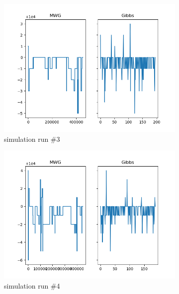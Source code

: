 \begin{figure}[H]
\begin{subfigure}{.3\textwidth}
	    \centering
    	\includegraphics[width=\linewidth]{../../plots/Trace_post_burnin_M2_N20000_NMCMC3_seed2_diffind2.png}
    	\caption{simulation run \#3}
	\end{subfigure}
	\begin{subfigure}{.3\textwidth}
	    \centering
    	\includegraphics[width=\linewidth]{../../plots/Trace_post_burnin_M2_N20000_NMCMC3_seed3_diffind2.png}
    	\caption{simulation run \#4}
	\end{subfigure}
	\begin{subfigure}{.3\textwidth}
	    \centering

\end{subfigure}
\end{figure}
